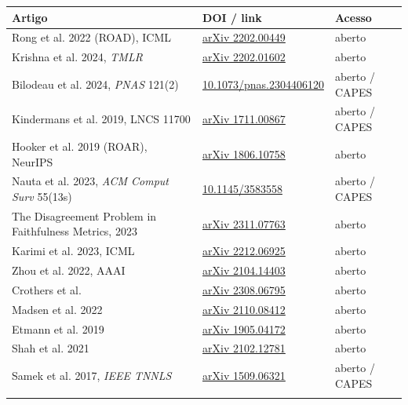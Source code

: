 \documentclass[11pt,a4paper]{article}
\begin{document}
{\scriptsize\setlength{\tabcolsep}{3pt}
\begin{xltabular}{\linewidth}{>{\raggedright\arraybackslash}X>{\raggedright\arraybackslash}X>{\raggedright\arraybackslash}X}
\toprule
\textbf{Artigo} & \textbf{DOI / link} & \textbf{Acesso} \\
\midrule
\endhead
Rong et al. 2022 (ROAD), ICML & \href{https://arxiv.org/abs/2202.00449}{arXiv 2202.00449} & aberto \\ \addlinespace[1pt]
Krishna et al. 2024, \textit{TMLR} & \href{https://arxiv.org/abs/2202.01602}{arXiv 2202.01602} & aberto \\ \addlinespace[1pt]
Bilodeau et al. 2024, \textit{PNAS} 121(2) & \href{https://arxiv.org/abs/2212.11870}{10.1073/pnas.2304406120} & aberto / CAPES \\ \addlinespace[1pt]
Kindermans et al. 2019, LNCS 11700 & \href{https://arxiv.org/abs/1711.00867}{arXiv 1711.00867} & aberto / CAPES \\ \addlinespace[1pt]
Hooker et al. 2019 (ROAR), NeurIPS & \href{https://arxiv.org/abs/1806.10758}{arXiv 1806.10758} & aberto \\ \addlinespace[1pt]
Nauta et al. 2023, \textit{ACM Comput Surv} 55(13s) & \href{https://arxiv.org/abs/2201.08164}{10.1145/3583558} & aberto / CAPES \\ \addlinespace[1pt]
The Disagreement Problem in Faithfulness Metrics, 2023 & \href{https://arxiv.org/abs/2311.07763}{arXiv 2311.07763} & aberto \\ \addlinespace[1pt]
Karimi et al. 2023, ICML & \href{https://arxiv.org/abs/2212.06925}{arXiv 2212.06925} & aberto \\ \addlinespace[1pt]
Zhou et al. 2022, AAAI & \href{https://arxiv.org/abs/2104.14403}{arXiv 2104.14403} & aberto \\ \addlinespace[1pt]
Crothers et al. & \href{https://arxiv.org/abs/2308.06795}{arXiv 2308.06795} & aberto \\ \addlinespace[1pt]
Madsen et al. 2022 & \href{https://arxiv.org/abs/2110.08412}{arXiv 2110.08412} & aberto \\ \addlinespace[1pt]
Etmann et al. 2019 & \href{https://arxiv.org/abs/1905.04172}{arXiv 1905.04172} & aberto \\ \addlinespace[1pt]
Shah et al. 2021 & \href{https://arxiv.org/abs/2102.12781}{arXiv 2102.12781} & aberto \\ \addlinespace[1pt]
Samek et al. 2017, \textit{IEEE TNNLS} & \href{https://arxiv.org/abs/1509.06321}{arXiv 1509.06321} & aberto / CAPES \\ \addlinespace[1pt]

\end{xltabular}}
\end{document}
